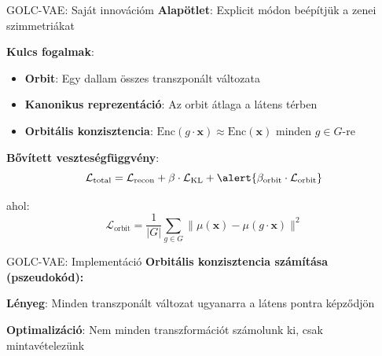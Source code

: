 \documentclass[aspectratio=169]{beamer}
\begin{document}
\begin{frame}{GOLC-VAE: Saját innovációm}
\textbf{Alapötlet}: Explicit módon beépítjük a zenei szimmetriákat

\vspace{0.5em}
\textbf{Kulcs fogalmak}:
\begin{itemize}
    \item \textbf{Orbit}: Egy dallam összes transzponált változata
    \item \textbf{Kanonikus reprezentáció}: Az orbit átlaga a látens térben
    \item \textbf{Orbitális konzisztencia}: $\text{Enc}(g \cdot \mathbf{x}) \approx \text{Enc}(\mathbf{x})$ minden $g \in G$-re
\end{itemize}

\vspace{0.5em}
\textbf{Bővített veszteségfüggvény}:
\[
\mathcal{L}_{\text{total}} = \mathcal{L}_{\text{recon}} + \beta \cdot \mathcal{L}_{\text{KL}} + \alert{\beta_{\text{orbit}} \cdot \mathcal{L}_{\text{orbit}}}
\]

\vspace{0.5em}
ahol:
\[
\mathcal{L}_{\text{orbit}} = \frac{1}{|G|} \sum_{g \in G} \|\mu(\mathbf{x}) - \mu(g \cdot \mathbf{x})\|^2
\]
\end{frame}

\begin{frame}{GOLC-VAE: Implementáció}
\textbf{Orbitális konzisztencia számítása (pszeudokód):}

\begin{center}
\end{center}

\vspace{0.5em}
\textbf{Lényeg}: Minden transzponált változat ugyanarra a látens pontra képződjön

\vspace{0.3em}
\textbf{Optimalizáció}: Nem minden transzformációt számolunk ki, csak mintavételezünk
\end{frame}
\end{document}
